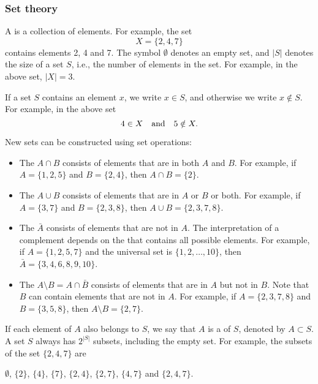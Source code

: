 \subsubsection{Set theory}


A  is a collection of elements.
For example, the set
\[X=\{2,4,7\}\]
contains elements 2, 4 and 7.
The symbol $\emptyset$ denotes an empty set,
and $|S|$ denotes the size of a set $S$,
i.e., the number of elements in the set.
For example, in the above set, $|X|=3$.

If a set $S$ contains an element $x$,
we write $x \in S$,
and otherwise we write $x \notin S$.
For example, in the above set
\[4 \in X \hspace{10px}\textrm{and}\hspace{10px} 5 \notin X.\]

\begin{samepage}
New sets can be constructed using set operations:
\begin{itemize}
\item The  $A \cap B$ consists of elements
that are in both $A$ and $B$.
For example, if $A=\{1,2,5\}$ and $B=\{2,4\}$,
then $A \cap B = \{2\}$.
\item The  $A \cup B$ consists of elements
that are in $A$ or $B$ or both.
For example, if $A=\{3,7\}$ and $B=\{2,3,8\}$,
then $A \cup B = \{2,3,7,8\}$.
\item The  $\bar A$ consists of elements
that are not in $A$.
The interpretation of a complement depends on
the  that contains all possible elements.
For example, if $A=\{1,2,5,7\}$ and the universal set is
$\{1,2,\ldots,10\}$, then $\bar A = \{3,4,6,8,9,10\}$.
\item The  $A \setminus B = A \cap \bar B$
consists of elements that are in $A$ but not in $B$.
Note that $B$ can contain elements that are not in $A$.
For example, if $A=\{2,3,7,8\}$ and $B=\{3,5,8\}$,
then $A \setminus B = \{2,7\}$.
\end{itemize}
\end{samepage}

If each element of $A$ also belongs to $S$,
we say that $A$ is a  of $S$,
denoted by $A \subset S$.
A set $S$ always has $2^{|S|}$ subsets,
including the empty set.
For example, the subsets of the set $\{2,4,7\}$ are
\begin{center}
$\emptyset$,
$\{2\}$, $\{4\}$, $\{7\}$, $\{2,4\}$, $\{2,7\}$, $\{4,7\}$ and $\{2,4,7\}$.
\end{center}

